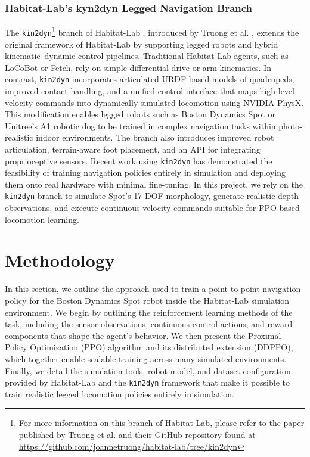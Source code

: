 \documentclass{article} %
\begin{document}
\subsubsection{Habitat-Lab's kyn2dyn Legged Navigation Branch }

The \texttt{kin2dyn}\footnote{For more information on this branch of Habitat-Lab, please refer to the paper published by Truong et al. \cite{truong2022kin2dyn} and their GitHub repository found at \url{https://github.com/joannetruong/habitat-lab/tree/kin2dyn}} branch of Habitat-Lab , introduced by Truong et al. \cite{truong2022kin2dyn}, extends the original framework of Habitat-Lab by supporting legged robots and hybrid kinematic–dynamic control pipelines. Traditional Habitat-Lab agents, such as LoCoBot or Fetch, rely on simple differential-drive or arm kinematics. In contrast, \texttt{kin2dyn} incorporates articulated URDF-based models of quadrupeds, improved contact handling, and a unified control interface that maps high-level velocity commands into dynamically simulated locomotion using NVIDIA PhysX. This modification enables legged robots such as Boston Dynamics Spot or Unitree's A1 robotic dog to be trained in complex navigation tasks within photo-realistic indoor environments. The branch also introduces improved robot articulation, terrain-aware foot placement, and an API for integrating proprioceptive sensors. Recent work using \texttt{kin2dyn} has demonstrated the feasibility of training navigation policies entirely in simulation and deploying them onto real hardware with minimal fine-tuning. In this project, we rely on the \texttt{kin2dyn} branch to simulate Spot’s 17-DOF morphology, generate realistic depth observations, and execute continuous velocity commands suitable for PPO-based locomotion learning.

\section{Methodology}
In this section, we outline the approach used to train a point-to-point navigation policy for the Boston Dynamics Spot robot inside the Habitat-Lab simulation environment. We begin by outlining the reinforcement learning methods of the task, including the sensor observations, continuous control actions, and reward components that shape the agent’s behavior. We then present the Proximal Policy Optimization (PPO) algorithm and its distributed extension (DDPPO), which together enable scalable training across many simulated environments. Finally, we detail the simulation tools, robot model, and dataset configuration provided by Habitat-Lab and the \texttt{kin2dyn} framework that make it possible to train realistic legged locomotion policies entirely in simulation.
\end{document}
